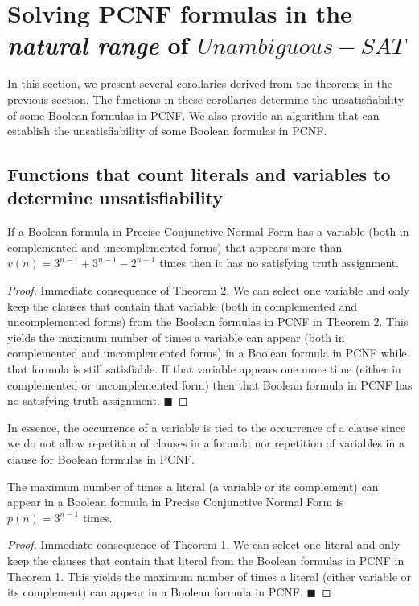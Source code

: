 \documentclass[runningheads,a4paper]{llncs}
\begin{document}
\section{Solving PCNF formulas in the \emph{natural range} of ${Unambiguous-SAT}$} 

In this section, we present several corollaries derived from the theorems in the previous section. The functions in these corollaries determine the unsatisfiability of some Boolean formulas in PCNF. We also provide an algorithm that can establish the unsatisfiability of some Boolean formulas in PCNF. 

\subsection{Functions that count literals and variables to determine unsatisfiability}
\begin{corollary}\normalfont
If a Boolean formula in Precise Conjunctive Normal Form has a variable (both in complemented and uncomplemented forms) that appears more than $v(n) = 3^{n-1}+3^{n-1}-2^{n-1}$ times then it has no satisfying truth assignment.

\begin{proof}\normalfont
Immediate consequence of Theorem 2. We can select one variable and only keep the clauses that contain that variable (both in complemented and uncomplemented forms) from the Boolean formulas in PCNF in Theorem 2. This yields the maximum number of times a variable can appear (both in complemented and uncomplemented forms) in a Boolean formula in PCNF while that formula is still satisfiable. If that variable appears one more time (either in complemented or uncomplemented form) then that Boolean formula in PCNF has no satisfying truth assignment. $\blacksquare$

\end{proof}
\end{corollary}

In essence, the occurrence of a variable is tied to the occurrence of a clause since we do not allow repetition of clauses in a formula nor repetition of variables in a clause for Boolean formulas in PCNF.

\newpage

\begin{corollary}\normalfont
The maximum number of times a literal (a variable or its complement) can appear in a Boolean formula in Precise Conjunctive Normal Form is  $p(n) = 3^{n-1}$ times. 
\begin{proof}\normalfont
Immediate consequence of Theorem 1. We can select one literal and only keep the clauses that contain that literal from the Boolean formulas in PCNF in Theorem 1. This yields the maximum number of times a literal (either variable or its complement) can appear in a Boolean formula in PCNF. $\blacksquare$
\end{proof}
\end{corollary}
\end{document}
